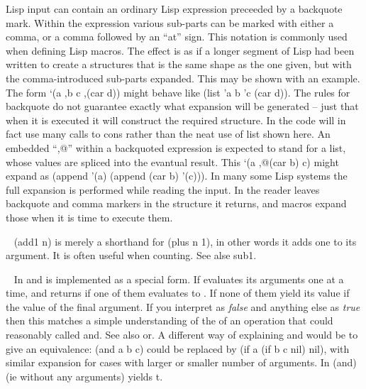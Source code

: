 \begin{description}
Lisp input can contain an ordinary Lisp expression preceeded by a backquote
mark. Within the expression various sub-parts can be marked with
either a comma, or a comma followed by an ``at'' sign. This notation is
commonly used when defining Lisp macros. The effect is as if a longer
segment of Lisp had been written to create a structures that is the same
shape as the one given, but with the comma-introduced sub-parts expanded.
This may be shown with an example. The form {\tx `(a ,b c ,(car d))}
might behave like {\tx (list 'a b 'c (car d))}. The rules for backquote
do not guarantee exactly what expansion will be generated -- just that when
it is executed it will construct the required structure. In \vsl{} the code
will in fact use many calls to {\tx cons} rather than the neat use of
{\tx list} shown here. An embedded ``{\tx ,@}'' within a backquoted
expression is expected to stand for a list, whose values are spliced into
the evantual result. This {\tx `(a ,@(car b) c)} might expand as
{\tx (append '(a) (append (car b) '(c)))}. In many some Lisp
systems the full expansion is performed while reading the input. In \vsl{} the
reader leaves backquote and comma markers in the structure it returns, and
macros expand those when it is time to execute them.
\item[{\tx add1~~~~~~~~~} \hspace{1cm} {\em function 1 arg}]~\newline
{\tx (add1 n)} is merely a shorthand for {\tx (plus n 1)}, in
other words it adds one to its argument. It is often useful when counting. See
alse {\tx sub1}.
\item[{\tx and~~~~~~~~~~} \hspace{1cm} {\em function n args}]~\newline
In \vsl{} {\tx and} is implemented as a special form. If evaluates its
arguments one at a time, and returns \nil{} if one of them evaluates
to \nil. If none of them yield \nil{} its value if the value of the final
argument. If you interpret \nil{} as {\em false} and anything else as
{\em true} then this matches a simple understanding of the of an operation that
could reasonably called {\tx and}. See also {\tx or}.
A different way of explaining {\tx and} would be to give an
equivalence: {\tx (and a b c)} could be replaced by
{\tx (if a (if b c nil) nil)}, with similar expansion for cases with
larger or smaller number of arguments. In \vsl{} {\tx (and)} (ie without
any arguments) yields {\tx t}.
\item[{\tx append~~~~~~~} \hspace{1cm} {\em function 2 args}]~\newline

\end{description}
